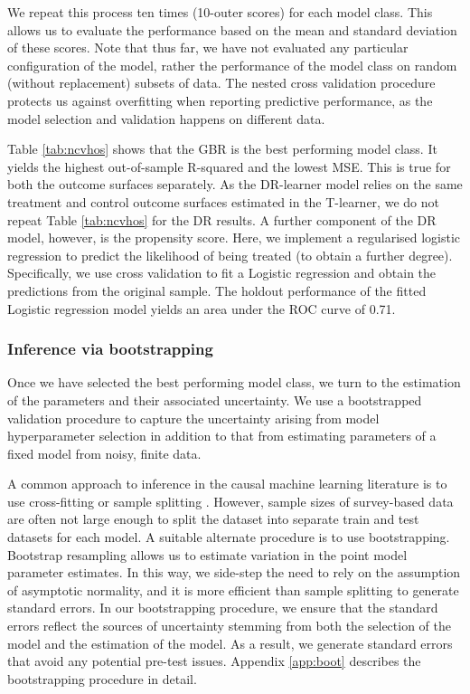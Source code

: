 \documentclass[12pt, a4paper]{article}
\begin{document}
We repeat this process ten times (10-outer scores) for each model class. This
allows us to evaluate the performance based on the mean and standard deviation
of these scores. Note that thus far, we have not evaluated any particular
configuration of the model, rather the performance of the model class on random
(without replacement) subsets of data. The nested cross validation procedure
protects us against overfitting when reporting predictive performance, as the
model selection and validation happens on different data.

Table \ref{tab:ncvhos} shows that the GBR is the best performing model class.
It yields the highest out-of-sample R-squared and the lowest MSE. This is true
for both the outcome surfaces separately. As the DR-learner model relies on the same treatment and control outcome surfaces estimated in the T-learner, we do not repeat Table \ref{tab:ncvhos} for the DR results. A further component of the DR model, however, is the propensity score. Here, we implement a regularised logistic regression to predict the likelihood of being treated (to obtain a further degree). Specifically, we use cross validation to fit a Logistic regression and obtain the predictions from the original sample. The holdout performance of the fitted Logistic regression model yields an area under the ROC curve of 0.71.

\subsubsection*{Inference via bootstrapping}

Once we have selected the best performing model class, we turn to the
estimation of the parameters and their associated uncertainty. We use a
bootstrapped validation procedure to capture the uncertainty arising from
model hyperparameter selection in addition to that from estimating parameters
of a fixed model from noisy, finite data. 


A common approach to inference in the causal machine learning literature is to use cross-ﬁtting \citep{cherno2018} or sample splitting \citep{athey2019}. However, sample sizes of survey-based data are often not large enough to split the dataset into separate train and test datasets for each model. A suitable alternate procedure is to use bootstrapping. Bootstrap resampling
allows us to estimate variation in the point model parameter estimates. In this
way, we side-step the need to rely on the assumption of asymptotic normality,
and it is more efficient than sample splitting to generate standard errors. In
our bootstrapping procedure, we ensure that the standard errors reflect the
sources of uncertainty stemming from both the selection of the model and the
estimation of the model. As a result, we generate standard errors that avoid
any potential pre-test issues. Appendix \ref{app:boot} describes the bootstrapping procedure in detail.
\end{document}
